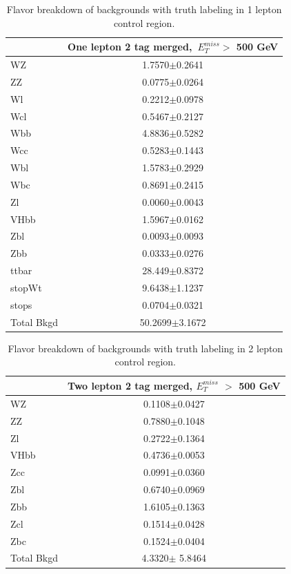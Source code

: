 \begin{table}
    \centering
    \tiny
    \begin{tabular}{l|c|}
        \cline{2-2} & \multicolumn{1}{c|}{One lepton 2 tag merged,~$E_{T}^{miss}$$ >$ 500 GeV} \\
        \hline
        WZ    & 1.7570$\pm$0.2641 \\
        ZZ    & 0.0775$\pm$0.0264 \\
        Wl    & 0.2212$\pm$0.0978 \\
        Wcl   & 0.5467$\pm$0.2127 \\
        Wbb   & 4.8836$\pm$0.5282 \\
        Wcc   & 0.5283$\pm$0.1443 \\
        Wbl   & 1.5783$\pm$0.2929 \\
        Wbc   & 0.8691$\pm$0.2415 \\
        Zl    & 0.0060$\pm$0.0043 \\
        VHbb  & 1.5967$\pm$0.0162 \\
        Zbl   & 0.0093$\pm$0.0093 \\
        Zbb   & 0.0333$\pm$0.0276 \\
        ttbar & 28.449$\pm$0.8372 \\
        stopWt& 9.6438$\pm$1.1237 \\
        stops & 0.0704$\pm$0.0321 \\
        \hline
        Total Bkgd & 50.2699$\pm$3.1672 \\
        \hline
    \end{tabular}
    \caption{Flavor breakdown of backgrounds with truth labeling in 1 lepton control region.}
    \label{tab:fl1}
\end{table}    

\begin{table}
    \centering
    \tiny
    \begin{tabular}{l|c|}
        \cline{2-2} & \multicolumn{1}{c|}{Two lepton 2 tag merged, $E_{T}^{miss}$ $>$ 500 GeV} \\
        \hline
        WZ    & 0.1108$\pm$0.0427 \\
        ZZ    & 0.7880$\pm$0.1048 \\
        Zl    & 0.2722$\pm$0.1364 \\
        VHbb  & 0.4736$\pm$0.0053 \\
        Zcc   & 0.0991$\pm$0.0360 \\
        Zbl   & 0.6740$\pm$0.0969 \\
        Zbb   & 1.6105$\pm$0.1363 \\
        Zcl   & 0.1514$\pm$0.0428 \\
        Zbc   & 0.1524$\pm$0.0404 \\
        \hline
        Total Bkgd & 4.3320$\pm$ 5.8464 \\
        \hline
    \end{tabular}
    \caption{Flavor breakdown of backgrounds with truth labeling in 2 lepton control region.}
    \label{tab:fl2}
\end{table}

